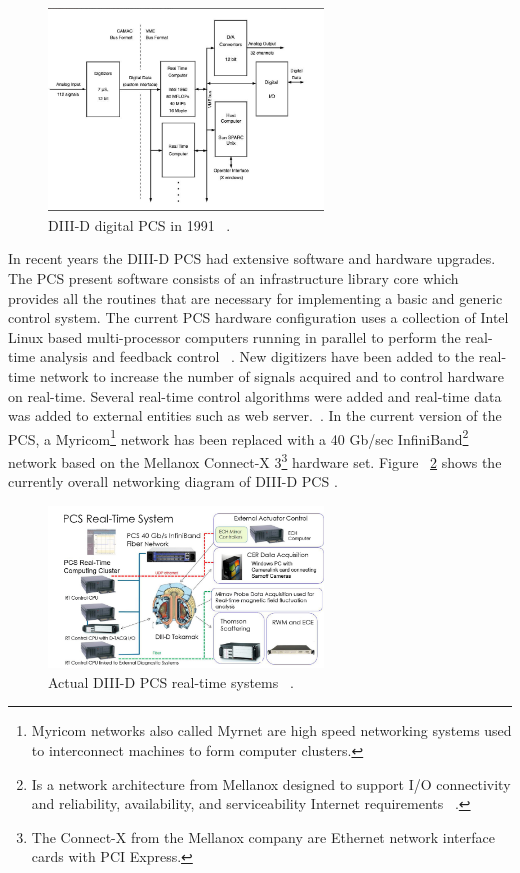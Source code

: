 \begin{figure}[htbp]
	\centering
	\includegraphics[width=0.65\textwidth]{Chp2/DIIDPCS_old.png}
	\caption{\label{DIII1991} DIII-D digital PCS in 1991 ~\cite{DIIDcontrol}.  }
\end{figure}

In recent years the DIII-D PCS had extensive software and hardware upgrades. The PCS present software consists of an infrastructure library core which provides all the routines that are necessary for implementing a basic and generic control system. The current  PCS hardware configuration uses a collection of  Intel Linux based multi-processor computers running in parallel to perform the real-time analysis and feedback control ~\cite{DIIID2013}. New digitizers have been added to the real-time network to increase the number of signals acquired and to control hardware on real-time. Several real-time control algorithms were added and real-time data was added to external entities such as web server.~\cite{DIIIDnew}. In the current version of the PCS, a Myricom\footnote{Myricom networks also called Myrnet are high speed networking systems used to interconnect machines to form computer clusters. } network has been replaced with a 40 Gb/sec InfiniBand\footnote{Is a network architecture from Mellanox designed to support I/O connectivity  and  reliability, availability, and serviceability Internet requirements ~\cite{MellanoxTechnologies2003}.  } network based on the Mellanox Connect-X 3\footnote{The Connect-X from the Mellanox company are Ethernet network interface cards with PCI Express.} hardware set. Figure ~\ref{DIIInew} shows the currently overall networking diagram of DIII-D PCS .


\begin{figure}[htbp]
	\centering
	\includegraphics[width=0.65\textwidth]{Chp2/DIIIDPCSnew.PNG}
	\caption{\label{DIIInew} Actual DIII-D PCS real-time systems ~\cite{DIIIDnew}.  }
\end{figure}


